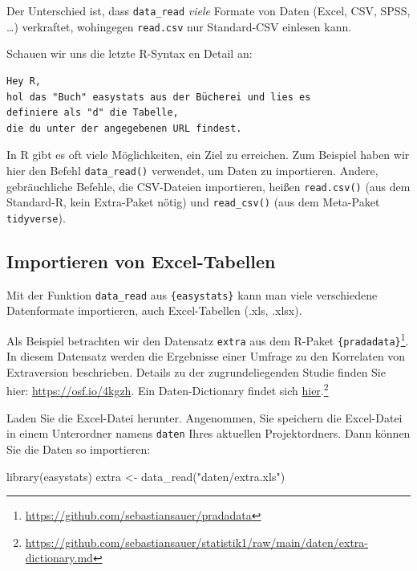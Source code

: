 \documentclass[
  a4paper,
]{scrbook}
\newenvironment{Shaded}{\begin{snugshade}}{\end{snugshade}}
\newcommand{\FunctionTok}[1]{\textcolor[rgb]{0.28,0.35,0.67}{#1}}
\newcommand{\NormalTok}[1]{\textcolor[rgb]{0.00,0.23,0.31}{#1}}
\newcommand{\OtherTok}[1]{\textcolor[rgb]{0.00,0.23,0.31}{#1}}
\newcommand{\StringTok}[1]{\textcolor[rgb]{0.13,0.47,0.30}{#1}}
\theoremstyle{definition}
\theoremstyle{definition}
\theoremstyle{definition}
\theoremstyle{remark}
\begin{document}
Der Unterschied ist, dass \texttt{data\_read} \emph{viele} Formate von
Daten (Excel, CSV, SPSS, \ldots) verkraftet, wohingegen
\texttt{read.csv} nur Standard-CSV einlesen kann.

Schauen wir uns die letzte R-Syntax en Detail an:

\begin{verbatim}
Hey R,
hol das "Buch" easystats aus der Bücherei und lies es
definiere als "d" die Tabelle,
die du unter der angegebenen URL findest.
\end{verbatim}

In R gibt es oft viele Möglichkeiten, ein Ziel zu erreichen. Zum
Beispiel haben wir hier den Befehl \texttt{data\_read()} verwendet, um
Daten zu importieren. Andere, gebräuchliche Befehle, die CSV-Dateien
importieren, heißen \texttt{read.csv()} (aus dem Standard-R, kein
Extra-Paket nötig) und \texttt{read\_csv()} (aus dem Meta-Paket
\texttt{tidyverse}).

\subsection{Importieren von
Excel-Tabellen}\label{importieren-von-excel-tabellen}

Mit der Funktion \texttt{data\_read} aus \texttt{\{easystats\}} kann man
viele verschiedene Datenformate importieren, auch Excel-Tabellen (.xls,
.xlsx).

Als Beispiel betrachten wir den Datensatz \texttt{extra} aus dem R-Paket
\texttt{\{pradadata\}}\footnote{\url{https://github.com/sebastiansauer/pradadata}}.
In diesem Datensatz werden die Ergebnisse einer Umfrage zu den
Korrelaten von Extraversion beschrieben. Details zu der
zugrundeliegenden Studie finden Sie hier: \url{https://osf.io/4kgzh}.
Ein Daten-Dictionary findet sich
\href{https://github.com/sebastiansauer/statistik1/raw/main/daten/extra-dictionary.md}{hier}.\footnote{\url{https://github.com/sebastiansauer/statistik1/raw/main/daten/extra-dictionary.md}}

Laden Sie die Excel-Datei herunter. Angenommen, Sie speichern die
Excel-Datei in einem Unterordner namens \texttt{daten} Ihres aktuellen
Projektordners. Dann können Sie die Daten so importieren:

\begin{Shaded}
\begin{Highlighting}[]
\FunctionTok{library}\NormalTok{(easystats)}
\NormalTok{extra }\OtherTok{\textless{}{-}} \FunctionTok{data\_read}\NormalTok{(}\StringTok{"daten/extra.xls"}\NormalTok{)}
\end{Highlighting}
\end{Shaded}
\end{document}
